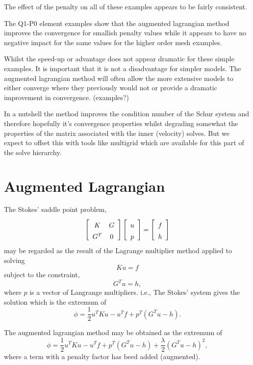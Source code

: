 \documentclass[]{svjour3}
\def\beq{\begin{equation}}
\def\eeq{\end{equation}}
\begin{document}
The effect of the penalty on all of these examples appears to be fairly consistent.

The Q1-P0 element examples show that the augmented lagrangian method improves the convergence for smallish penalty values while
it appears to have no negative impact for the same values for the higher order mesh examples.

Whilst the speed-up or advantage does not appear dramatic for these simple examples.
It is important that it is not a disadvantage for simpler models.
The augmented lagrangian method will often allow the more extensive models to either converge where they previously would not or provide a dramatic improvement in convergence.
(examples?)

In a nutshell the method improves the condition number of the Schur system and therefore hopefully it's convergence properties
whilst degrading somewhat the properties of the matrix associated with the inner (velocity) solves. But we expect to offset this
with tools like multigrid which are available for this part of the solve hierarchy.

\section{Augmented Lagrangian}
The Stokes' saddle point problem,
\beq
   \left[\begin{array}{cc}
       K   & G \rule{0pt}{13pt}\\
       G^T & 0 \rule{0pt}{13pt}
   \end{array}\right]
   \left[
\begin{array}{c}
u  \rule{0pt}{13pt}\\
p   \rule{0pt}{13pt}
\end{array}
\right] 
=
\left[\begin{array}{c}
f  \rule{0pt}{13pt}\\
h   \rule{0pt}{13pt}
\end{array}
\right]
\label{stokes}
\eeq
may be regarded as the result of the Lagrange multiplier method applied to solving
\beq
   K u = f
\eeq
subject to the constraint,
\beq
  G^T u  = h,
\eeq
where $p$ is a vector of Langrange multipliers. i.e.,
The Stokes' system gives the solution which is the extremum of
\beq
    \phi = \frac{1}{2}u^T K u - u^T f + p^T(G^T u -h).
\eeq

The augmented lagrangian method may be obtained as the extremum of
\beq
    \phi = \frac{1}{2}u^T K u - u^T f + p^T(G^T u -h) + \frac{\lambda}{2}(G^T u -h)^2,\label{al}
\eeq
where a term with a penalty factor has beed added (augmented).
\end{document}
